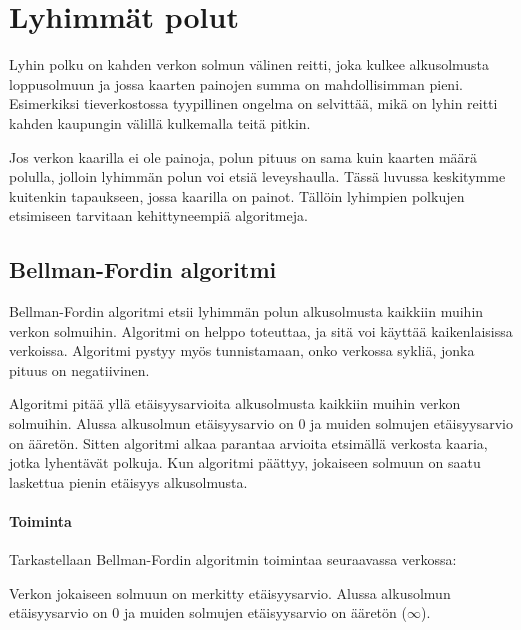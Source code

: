 \chapter{Lyhimmät polut}

Lyhin polku on kahden verkon solmun
välinen reitti,
joka kulkee alkusolmusta loppusolmuun ja
jossa kaarten painojen summa on
mahdollisimman pieni.
Esimerkiksi tieverkostossa
tyypillinen ongelma on selvittää,
mikä on lyhin reitti kahden kaupungin
välillä kulkemalla teitä pitkin.

Jos verkon kaarilla ei ole painoja,
polun pituus on sama kuin kaarten
määrä polulla, jolloin lyhimmän polun
voi etsiä leveyshaulla.
Tässä luvussa keskitymme kuitenkin
tapaukseen, jossa kaarilla on painot.
Tällöin lyhimpien polkujen etsimiseen
tarvitaan kehittyneempiä algoritmeja.

\section{Bellman-Fordin algoritmi}

Bellman-Fordin algoritmi etsii
lyhimmän polun alkusolmusta
kaikkiin muihin verkon solmuihin.
Algoritmi on helppo toteuttaa, ja
sitä voi käyttää kaikenlaisissa verkoissa.
Algoritmi pystyy myös tunnistamaan,
onko verkossa sykliä,
jonka pituus on negatiivinen.

Algoritmi pitää yllä etäisyysarvioita
alkusolmusta kaikkiin muihin verkon solmuihin.
Alussa alkusolmun etäisyysarvio on 0
ja muiden solmujen etäisyys\-arvio on ääretön.
Sitten algoritmi alkaa parantaa arvioita
etsimällä verkosta kaaria,
jotka lyhentävät polkuja.
Kun algoritmi päättyy,
jokaiseen solmuun on saatu laskettua
pienin etäisyys alkusolmusta.

\subsubsection{Toiminta}

Tarkastellaan Bellman-Fordin
algoritmin toimintaa seuraavassa verkossa:
\begin{center}
\end{center}
Verkon jokaiseen solmuun on merkitty etäisyysarvio.
Alussa alkusolmun etäisyysarvio on 0
ja muiden solmujen etäisyysarvio on
ääretön ($\infty$).

